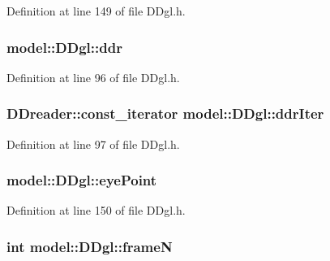 Definition at line 149 of file D\+Dgl.\+h.

\hypertarget{structmodel_1_1_d_dgl_a77fece43bf684300ff35f3d55f82fa45}{}
\subsubsection[{ddr}]{ model\+::\+D\+Dgl\+::ddr}\label{structmodel_1_1_d_dgl_a77fece43bf684300ff35f3d55f82fa45}


Definition at line 96 of file D\+Dgl.\+h.

\hypertarget{structmodel_1_1_d_dgl_ae751fe8e3ed0b4843e8057f284c0abe9}{}
\subsubsection[{ddr\+Iter}]{\setlength{\rightskip}{0pt plus 5cm}D\+Dreader\+::const\+\_\+iterator model\+::\+D\+Dgl\+::ddr\+Iter}\label{structmodel_1_1_d_dgl_ae751fe8e3ed0b4843e8057f284c0abe9}


Definition at line 97 of file D\+Dgl.\+h.

\hypertarget{structmodel_1_1_d_dgl_af4272f1d028cf9100f4b20610ddc71fb}{}
\subsubsection[{eye\+Point}]{ model\+::\+D\+Dgl\+::eye\+Point}\label{structmodel_1_1_d_dgl_af4272f1d028cf9100f4b20610ddc71fb}


Definition at line 150 of file D\+Dgl.\+h.

\hypertarget{structmodel_1_1_d_dgl_adbc0a9d8cb82b872dd9d0a9704bef392}{}
\subsubsection[{frame\+N}]{\setlength{\rightskip}{0pt plus 5cm}int model\+::\+D\+Dgl\+::frame\+N}\label{structmodel_1_1_d_dgl_adbc0a9d8cb82b872dd9d0a9704bef392}


